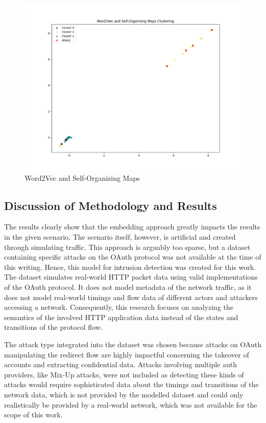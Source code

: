 \begin{figure}[H]
	\caption{Word2Vec and Self-Organizing Maps}
	\label{fig:som_clusters}
	\sffamily\footnotesize
	\includegraphics[width=1\textwidth]{pic/som_final.png}
	\unitlength=0.75mm
	\linethickness{0.4pt}
\end{figure}


\subsection{Discussion of Methodology and Results}
\label{subsec:results_discussion}

The results clearly show that the embedding approach greatly impacts the results in the given scenario. The scenario itself, however, is artificial and created through simulating traffic. This approach is arguably too sparse, but a dataset containing specific attacks on the OAuth protocol was not available at the time of this writing. Hence, this model for intrusion detection was created for this work. The dataset simulates real-world HTTP packet data using valid implementations of the OAuth protocol. It does not model metadata of the network traffic, as it does not model real-world timings and flow data of different actors and attackers accessing a network. Consequently, this research focuses on analyzing the semantics of the involved HTTP application data instead of the states and transitions of the protocol flow. 

The attack type integrated into the dataset was chosen because attacks on OAuth manipulating the redirect flow are highly impactful concerning the takeover of accounts and extracting confidential data. Attacks involving multiple auth providers, like Mix-Up attacks, were not included as detecting these kinds of attacks would require sophisticated data about the timings and transitions of the network data, which is not provided by the modelled dataset and could only realistically be provided by a real-world network, which was not available for the scope of this work.

